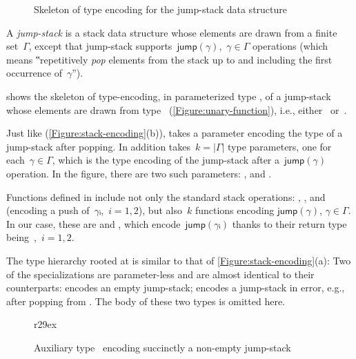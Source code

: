 \begin{wrapfigure}[19]{r}{44ex}
  \caption{Skeleton of type encoding for the jump-stack data structure}%
  \label{Figure:jump}%
\end{wrapfigure}

A \emph{jump-stack} is a stack data structure whose elements are drawn from a finite set~$Γ$,
  except that jump-stack supports~$\textsf{jump}(γ)$,~$γ∈Γ$ operations
  (which means ‟repetitively \emph{pop} elements from the stack up 
  to and including the first occurrence of~$γ$”).

 shows the skeleton of type-encoding, in parameterized type ,  
  of a jump-stack whose elements are drawn from type~
(\cref{Figure:unary-function}), i.e., either~ or~.

Just like  (\cref{Figure:stack-encoding}(b)),  takes 
  a  parameter encoding the type of a jump-stack after popping.%
In addition  takes~$k=|Γ|$ type parameters, one for each~$γ∈Γ$,
  which is the type encoding of the jump-stack after a~$\textsf{jump}(γ)$
  operation.
In the figure, there are two such parameters: , and
  .

Functions defined in  include not only the standard stack operations: ,
,  and~ (encoding a push of~$γᵢ$,~$i=1,2$),
but also~$k$ functions encoding $\textsf{jump}(\gamma)$, $\gamma \in \Gamma$.
In our case, these are  and ,
  which encode~$\textsf{jump}(γᵢ)$
  thanks to their return type being~,~$i=1,2$.

The type hierarchy rooted at  is similar to that of
\cref{Figure:stack-encoding}(a):
Two of the specializations are parameter-less and are
  almost identical to their 
  counterparts:
 encodes an empty jump-stack;  encodes a jump-stack in error,
e.g., after popping from .
The body of these two types is omitted here.

\begin{wrapfigure}[12]r{29ex}
  \caption{\label{Figure:jump-stack-push} Auxiliary type~ encoding succinctly a non-empty jump-stack}
\end{wrapfigure}

